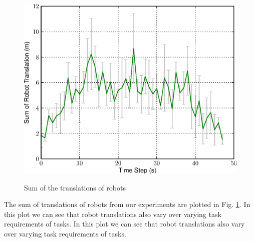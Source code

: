\documentclass[final,5p,times,twocolumn]{elsarticle}
\begin{document}
\begin{figure}
{\includegraphics[width=0.6\linewidth, angle=0]
{images/SC-DeltaTranslationStat.eps}}
\newline
{}
\newline 
\caption{Sum of the translations of robots}
\label{fig:translation-stat}
\end{figure}
The sum of translations of robots from our experiments are plotted in Fig. \ref{fig:translation-stat}. In this plot we can see that robot translations also vary over varying task requirements of tasks. In this plot we can see that robot translations also vary over varying task requirements of tasks. 
\end{document}
